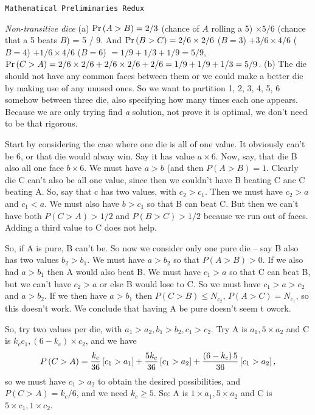 \def\newstep#1{\smallskip \noindent {\bf #1}}
\def\newprob#1{\vskip 0.12in \noindent {\bf #1}}

\topglue 0.5in
\centerline{\tt Mathematical Preliminaries Redux}
\vskip 0.3in


 {\it Non-transitive dice}\hfil\break
(a) ${\rm Pr}\left(A > B\right) = 2 / 3$ (chance of $A$ rolling a 5) $\times 5 / 6$
(chance that a 5 beats $B$) = 5 / 9.  And ${\rm Pr}\left(B > C\right) = 2 / 6 \times 2 / 6$
($B = 3$) $ + 3 / 6 \times 4 / 6$ ($B = 4$) $+ 1 / 6 \times 4 / 6$ ($B = 6$)
$ = 1 / 9 + 1 / 3 + 1 / 9 = 5 / 9$, ${\rm Pr}\left(C > A\right) = 2 / 6 \times 2 / 6 +
2 / 6 \times 2 / 6 + 2 / 6 = 1 / 9 + 1 / 9 + 1 / 3 = 5 / 9$.\hfil\break
(b) The die should not have any common faces between them or we could make a better
die by making use of any unused ones.  So we want to partition {1, 2, 3, 4, 5, 6} somehow between
three die, also specifying how many times each one appears.  Because we are only trying find
{\it a} solution, not prove it is optimal, we don't need to be that rigorous.

Start by considering the case where one die is all of one value.  It obviously can't be 6, or
that die would alway win.  Say it has value $a \times 6$.  Now, say, that die B also all one
face $b \times 6$.  We must have $a > b$ (and then $P\left(A > B\right) = 1$.   Clearly
die C can't also be all one value, since then we couldn't have B beating C anc C beating A.
So, say that c has two values, with $c_2 > c_1$.  Then we must have $c_2 > a$ and $c_1 < a$.
We must also have $b > c_1$ so that B can beat C.  But then we can't have both 
$P\left(C > A\right) > 1/2$ and $P \left(B > C\right) > 1/2$ because we run out of faces.
Adding a third value to C does not help.

So, if A is pure, B can't be.  So now we consider only one pure die -- say B also has two values
$b_2 > b_1$.  We must have $a > b_2$ so that $P\left(A > B\right) > 0$.  If we also had 
$a > b_1$ then A would also beat B.  We must have $c_1 > a$ so that C can beat B,
but we can't have $c_2 > a$ or else B would lose to C.  So we must have $c_1 > a > c_2$ and $a > b_2$.
If we then have $a > b_1$ then $P\left(C > B\right) \leq N_{c_2}$, $P \left(A > C\right) = N_{c_1}$,
so this doesn't work.  We conclude that having A be pure doesn't seem t owork.

So, try two values per die, with $a_1 > a_2, b_1 > b_2, c_1 > c_2$.  Try A is $a_1, 5 \times a_2$
and C is $k_c c_1, \left(6-k_c\right) \times c_2$, and we have
$$
 P\left(C > A\right) = {k_c \over 36} \left[c_1 > a_1\right] + {5 k_c \over 36} \left[c_1 > a_2\right]
  + {\left(6 - k_c\right) 5 \over 36} \left[c_1 > a_2\right],
$$
so we must have $c_1 > a_2$ to obtain the desired possibilities, and $P\left(C > A\right) = k_c / 6$,
and we need $k_c \geq 5$.  So: A is $1 \times a_1, 5 \times a_2$ and C is $5 \times c_1, 1 \times c_2$.

